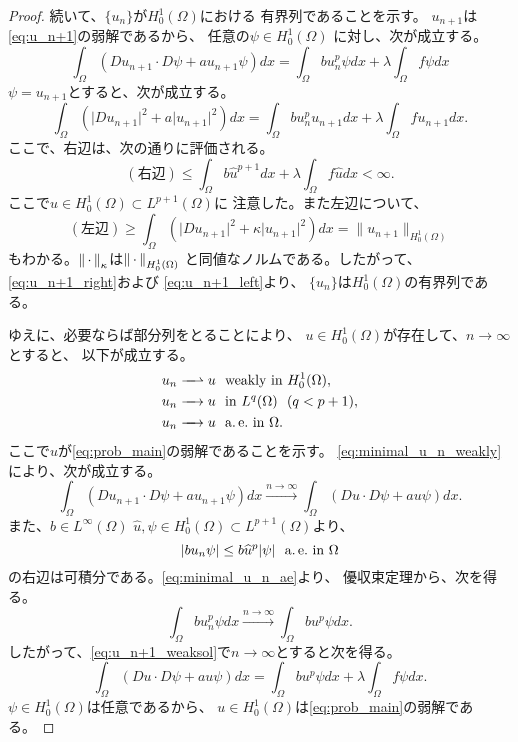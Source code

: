 \begin{proof}
 続いて、$\{u_n\}$が$H_0^1(\Omega)$における
 有界列であることを示す。
 $u_{n+1}$は\eqref{eq:u_n+1}の弱解であるから、
 任意の$\psi \in H_0^1(\Omega)$
 に対し、次が成立する。
 \begin{equation}
  \int_\Omega (Du_{n+1} \cdot D\psi + a u_{n+1} \psi) dx 
   = \int_\Omega bu_n^p \psi dx + \lambda \int_\Omega f\psi dx
   \label{eq:u_n+1_weaksol}
 \end{equation}
 $\psi = u_{n+1}$とすると、次が成立する。
 \[
 \int_\Omega (\lvert Du_{n+1} \rvert^2 
 + a \lvert u_{n+1} \rvert^2) dx 
 = \int_\Omega bu_n^p u_{n+1} dx 
 + \lambda \int_\Omega f u_{n+1} dx.
 \]
 ここで、右辺は、次の通りに評価される。
 \begin{equation}
  (\text{右辺}) \leq \int_\Omega b\hat{u}^{p+1} dx + \lambda
   \int_\Omega f \hat{u} dx < \infty. \label{eq:u_n+1_right}
 \end{equation}
 ここで$\hat{u} \in H_0^1(\Omega) \subset L^{p+1}(\Omega)$に
 注意した。また左辺について、
 \begin{equation}
  (\text{左辺}) \geq \int_\Omega \left( \lvert Du_{n+1} \rvert^2 + \kappa
   \lvert u_{n+1} \rvert^2 \right) dx = \| u_{n+1} \|_{H_0^1(\Omega)}
  \label{eq:u_n+1_left}
 \end{equation}
 もわかる。$\left\|\, \cdot \, \right\|_\kappa$は$\left\|\, \cdot \, \right\|_{H_0^1(\Omega)}$
 と同値なノルムである。したがって、\eqref{eq:u_n+1_right}および
 \eqref{eq:u_n+1_left}より、
 $\{u_n\}$は$H_0^1(\Omega)$の有界列である。

 ゆえに、必要ならば部分列をとることにより、
 $u \in H_0^1(\Omega)$が存在して、$n \to \infty$とすると、
 以下が成立する。
 \begin{align}
  u_n \xrightharpoonup{ \mbox{ ~ } } u & \ \ \text{weakly~} \tin
  H_0^1(\Omega), \label{eq:minimal_u_n_weakly} \\
  u_n \xrightarrow{ \mbox{ ~ } } u & \ \ \tin L^q(\Omega) \notag \ \
   (q < p+1), \\
  u_n \xrightarrow{ \mbox{ ~ } } u & \ \ \ae \tin \Omega. 
    \label{eq:minimal_u_n_ae}
 \end{align}
 ここで$u$が\ref{eq:prob_main}の弱解であることを示す。
 \eqref{eq:minimal_u_n_weakly}により、次が成立する。
 \[
 \int_\Omega (Du_{n+1} \cdot D\psi + a u_{n+1} \psi) dx
 \xrightarrow{n \to \infty}
 \int_\Omega (Du \cdot D\psi + a u \psi) dx.
 \]
 また、$b \in L^\infty(\Omega)$
 $\hat{u}, \psi \in H_0^1(\Omega) \subset L^{p+1}(\Omega)$より、
 \[
  \left\lvert bu_n \psi \right\rvert \leq b \widehat{u}^p \lvert\psi\rvert \ \ \text{a.\,e.}~
 \text{in}~ \Omega
 \]
 の右辺は可積分である。\eqref{eq:minimal_u_n_ae}より、
 優収束定理から、次を得る。
 \[
 \int_\Omega bu_n^p \psi dx \xrightarrow{n \to \infty} 
 \int_\Omega bu^p \psi dx.
 \]
 したがって、\eqref{eq:u_n+1_weaksol}で$n \to \infty$とすると次を得る。
 \begin{equation}
  \int_\Omega (Du \cdot D\psi + a u \psi) dx 
   = \int_\Omega bu^p \psi dx + \lambda \int_\Omega f\psi dx.
   \label{eq:minimal_u_weaksol}
 \end{equation}
 $\psi \in H_0^1(\Omega)$は任意であるから、
 $u \in H_0^1(\Omega)$は\ref{eq:prob_main}の弱解である。
 

\end{proof}
